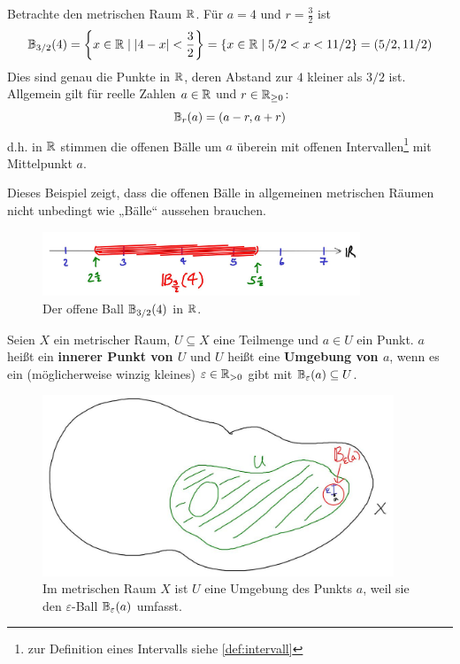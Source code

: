 \begin{bsp}
    Betrachte den metrischen Raum $\mathbb R$. Für $a=4$ und $r= \frac{3}{2}$ ist
        \[ \mathbb B_{3/2}(4) = \left\{ x\in \mathbb R\mid \vert 4-x\vert <\frac{3}{2} \right\} = \left\{ x\in \mathbb R\mid 5/2<x<11/2 \right\} = \left(5/2,11/2\right) \]
    Dies sind genau die Punkte in $\mathbb R$, deren Abstand zur $4$ kleiner als $3/2$ ist. Allgemein gilt für reelle Zahlen $a\in \mathbb R$ und $r\in \mathbb R_{\ge 0}$:
        \[ \mathbb B_r(a) = (a-r,a+r) \]
    d.h. in $\mathbb R$ stimmen die offenen Bälle um $a$ überein mit offenen Intervallen\footnote{zur Definition eines Intervalls siehe \cref{def:intervall}} mit Mittelpunkt $a$.
    
    Dieses Beispiel zeigt, dass die offenen Bälle in allgemeinen metrischen Räumen nicht unbedingt wie „Bälle“ aussehen brauchen.
    \begin{figure}[ht]
        \includegraphics[width=9.5cm]{./_img/1Dball.jpeg}
        \centering \caption{Der offene Ball $\mathbb B_{3/2}(4)$ in $\mathbb R$.}
    \end{figure}
\end{bsp}


\begin{defin} \label{def:umgebung}  
    Seien $X$ ein metrischer Raum, $U\subseteq X$ eine Teilmenge und $a\in U$ ein Punkt. $a$ heißt ein \textbf{innerer Punkt von $U$} und $U$ heißt eine \textbf{Umgebung von $a$}, wenn es ein (möglicherweise winzig kleines) $\varepsilon\in \mathbb R_{>0}$ gibt mit $\mathbb B_\varepsilon(a)\subseteq U$.
    \begin{figure}[ht!]
        \includegraphics[width=10.5cm]{./_img/Umgebung.jpeg}
        \centering \caption{Im metrischen Raum $X$ ist $U$ eine Umgebung des Punkts $a$, weil sie den $\varepsilon$-Ball $\mathbb B_\varepsilon(a)$ umfasst.}
    \end{figure}
\end{defin}


